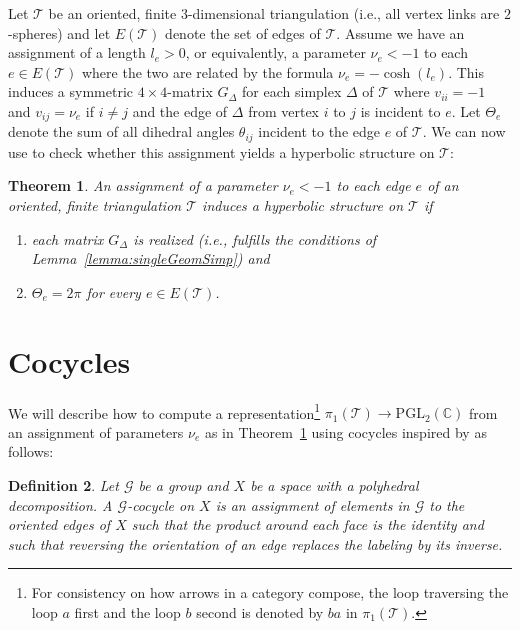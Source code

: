 \documentclass[utopia,fullpage]{nmd/article}
\newcommand{\negSpace}{\!}
\newcommand\C{\mathbb C}
\newtheorem{theorem}{Theorem}[section]
\newtheorem{definition}[theorem]{Definition}
\newcommand{\negSpace}{}
\newcommand\myPGL[2]{\mathrm{PGL}_{#1}(#2)}
\newcommand\trig{\mathcal{T}}
\newcommand\groupG{\mathcal{G}}
\begin{document}
Let $\trig$\negSpace{} be an oriented, finite 3-dimensional triangulation (i.e., all vertex links are $2$-spheres) and let $E(\trig)$ denote the set of edges of $\trig$\negSpace{}. 
Assume we have an assignment of a length $l_e>0$, or equivalently, a parameter $\nu_e < -1$ to each $e\in E(\trig)$ where the two are related by the formula $\nu_e=-\cosh(l_e)$. This induces a symmetric $4\times 4$-matrix $G_\Delta$ for each simplex $\Delta$ of $\trig$\negSpace{} where $v_{ii}=-1$ and $v_{ij}=\nu_e$ if $i\not=j$ and the edge of $\Delta$ from vertex $i$ to $j$ is incident to $e$. Let $\Theta_e$ denote the sum of all dihedral angles $\theta_{ij}$ incident to the edge $e$ of $\trig$\negSpace{}.
 We can now use \cite[Lemma~2.4]{heardThesis} to check whether this assignment yields a hyperbolic structure on $\trig$:
\begin{theorem}
An assignment of a parameter $\nu_e<-1$ to each edge $e$ of an oriented, finite triangulation $\trig$\negSpace{} induces a hyperbolic structure on $\trig$\negSpace{} if
\begin{enumerate}
\item \label{main:condA} each matrix $G_\Delta$ is realized (i.e., fulfills the conditions of Lemma~\ref{lemma:singleGeomSimp}) and
\item \label{main:condB} $\Theta_e=2\pi$ for every $e\in E(\trig)$.
\end{enumerate} \label{thm:hypStruct}
\end{theorem} 

\section{Cocycles} \label{sec:cocycles}

We will describe how to compute a representation\footnote{For consistency on how arrows in a category compose, the loop traversing the loop $a$ first and the loop $b$ second is denoted by $ba$ in $\pi_1(\trig)$.} $\pi_1(\trig)\to\myPGL{2}{\C}$ from an assignment of parameters $\nu_e$ as in Theorem~\ref{thm:hypStruct} using cocycles inspired by \cite[Section~9]{higherGluingEqns} as follows:
\begin{definition}
Let $\groupG$ be a group and $X$ be a space with a polyhedral decomposition.
A $\groupG$-cocycle on $X$ is an assignment of elements in $\groupG$ to the oriented edges of $X$ such that the product around each face is the identity and such that reversing the orientation of an edge replaces the labeling by its inverse.
\end{definition}
\end{document}
